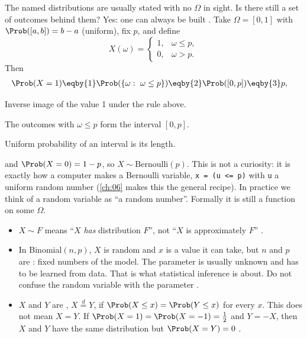 \label{1b:ex:bern-construction}
The named distributions are usually stated with no $\Omega$ in sight. Is
there still a set of outcomes behind them? Yes: one can always be built
. Take $\Omega=[0,1]$ with
$\Prob([a,b])=b-a$ (uniform), fix $p$, and define
\[
  X(\omega)=\begin{cases}1,&\omega\le p,\\ 0,&\omega>p.\end{cases}
\]
Then
\begin{align*}
  \Prob(X=1)
  &\eqby{1} \Prob(\{\omega:\ \omega\le p\})
   \eqby{2} \Prob([0,p])
   \eqby{3} p ,
\end{align*}
\begin{explain}
  \item Inverse image of the value 1 under the rule above.
  \item The outcomes with $\omega\le p$ form the interval $[0,p]$.
  \item Uniform probability of an interval is its length.
\end{explain}
and $\Prob(X=0)=1-p$, so $X\sim\text{Bernoulli}(p)$. This is not a
curiosity: it is exactly how a computer makes a Bernoulli variable,
\texttt{x = (u <= p)} with \texttt{u} a uniform random number
(\cref{ch:06} makes this the general recipe). In practice we think of a random
variable as ``a random number''. Formally it is still a function on some
$\Omega$.

\begin{pitfall}
\begin{itemize}[leftmargin=1.2em,itemsep=1pt]
  \item $X\sim F$ means ``$X$ \emph{has} distribution $F$'', not ``$X$ is
        approximately $F$'' .
  \item In Binomial$(n,p)$, $X$ is random and $x$ is a value it can take,
        but $n$ and $p$ are : fixed numbers of the model.
        The parameter is usually unknown and has to be learned from data.
        That is what statistical inference is about. Do not confuse the
        random variable with the parameter .
  \item $X$ and $Y$ are , $X\overset{d}{=}Y$,
        if $\Prob(X\le x)=\Prob(Y\le x)$ for every $x$. This does not mean
        $X=Y$. If $\Prob(X=1)=\Prob(X=-1)=\tfrac12$ and $Y=-X$, then $X$ and $Y$
        have the same distribution but $\Prob(X=Y)=0$ .
\end{itemize}
\end{pitfall}

